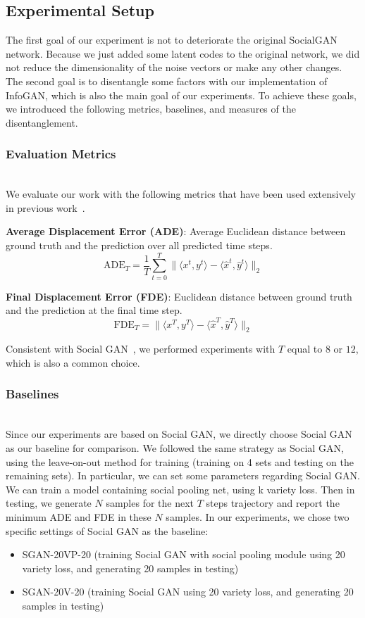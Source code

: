 \subsection{Experimental Setup}
The first goal of our experiment is not to deteriorate the original SocialGAN network. Because we just added some latent codes to the original network, we did not reduce the dimensionality of the noise vectors or make any other changes. The second goal is to disentangle some factors with our implementation of InfoGAN, which is also the main goal of our experiments. To achieve these goals, we introduced the following metrics, baselines, and measures of the disentanglement.


\subsubsection{Evaluation Metrics}
\hfill \\
We evaluate our work with the following metrics that have been used extensively in previous work~\cite{Gupta_2018_CVPR, distant_prediction, Alahi16}.

\textbf{Average Displacement Error (ADE)}:  Average Euclidean distance between ground truth and the prediction over all predicted time steps.
$$\text{ADE}_{T} = \frac 1 T \sum_{t=0}^{T} \lVert \langle x^t, y^t \rangle - \langle \hat x^t, \hat y^t \rangle \lVert_{2} $$


\textbf{Final Displacement Error (FDE)}: Euclidean distance between ground truth and the prediction at the final time step.
$$\text{FDE}_{T} = \lVert \langle x^T, y^T \rangle - \langle \hat x^T, \hat y^T \rangle \lVert_{2}  $$

Consistent with Social GAN~\cite{Gupta_2018_CVPR}, we performed experiments with $T$ equal to $8$ or $12$, which is also a common choice.


\subsubsection{Baselines}
\hfill \\
Since our experiments are based on Social GAN, we directly choose Social GAN as our baseline for comparison. We followed the same strategy as Social GAN, using the leave-on-out method for training (training on 4 sets and testing on the remaining sets). In particular,  we can set some parameters regarding Social GAN. We can train a model containing social pooling net, using k variety loss. Then in testing, we generate $N$ samples for the next $T$ steps trajectory and report the minimum ADE and FDE in these $N$ samples. In our experiments, we chose two specific settings of Social GAN as the baseline:
\begin{itemize}
  \item SGAN-20VP-20 (training Social GAN with social pooling module using 20 variety loss, and generating 20 samples in testing)
  \item SGAN-20V-20 (training Social GAN using 20 variety loss, and generating 20 samples in testing)
\end{itemize}

